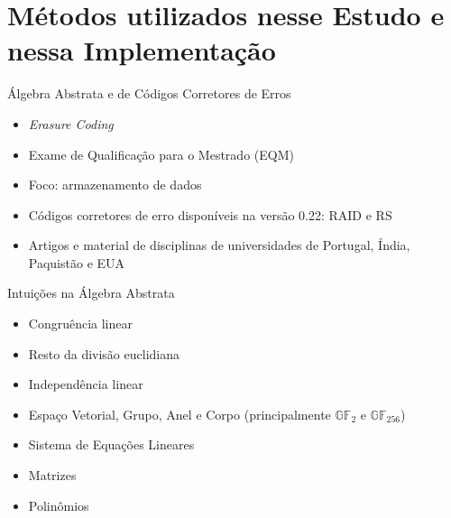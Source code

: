  \section{Métodos utilizados nesse Estudo e nessa Implementação}

  \begin{frame}{Álgebra Abstrata e de Códigos Corretores de Erros}
     \begin{itemize}
        \item<1-> \emph{Erasure Coding}
        \item<2-> Exame de Qualificação para o Mestrado (EQM)
        \item<3-> Foco: armazenamento de dados
        \item<4-> Códigos corretores de erro disponíveis na versão 0.22: RAID e RS
        \item<5-> Artigos e material de disciplinas de universidades de Portugal, Índia, Paquistão e EUA
     \end{itemize}
  \end{frame}

  \begin{frame}{Intuições na Álgebra Abstrata}
     \begin{itemize}
        \item<1-> Congruência linear
        \item<2-> Resto da divisão euclidiana
        \item<3-> Independência linear
        \item<4-> Espaço Vetorial, Grupo, Anel e Corpo (principalmente $\mathbb{GF}_2$ e $\mathbb{GF}_{256}$)
        \item<5-> Sistema de Equações Lineares
        \item<6-> Matrizes
        \item<7-> Polinômios
     \end{itemize}
  \end{frame}

